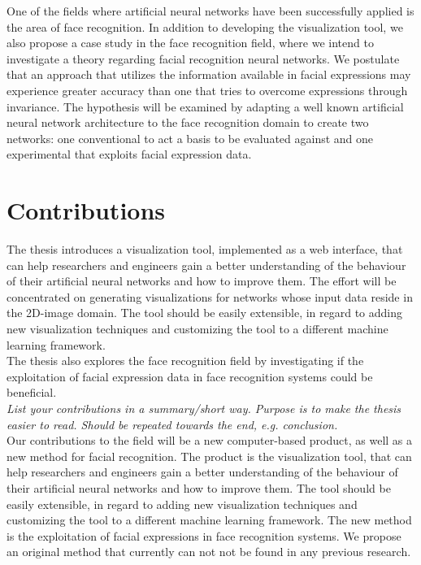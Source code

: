 \noindent One of the fields where artificial neural networks have been successfully applied is the area of face recognition. In addition to developing the visualization tool, we also propose a case study in the face recognition field, where we intend to investigate a theory regarding facial recognition neural networks. We postulate that an approach that utilizes the information available in facial expressions may experience greater accuracy than one that tries to overcome expressions through invariance. The hypothesis will be examined by adapting a well known artificial neural network architecture to the face recognition domain to create two networks: one conventional to act a basis to be evaluated against and one experimental that exploits facial expression data. \\

\section{Contributions}

The thesis introduces a visualization tool, implemented as a web interface, that can help researchers and engineers gain a better understanding of the behaviour of their artificial neural networks and how to improve them. The effort will be concentrated on generating visualizations for networks whose input data reside in the 2D-image domain. The tool should be easily extensible, in regard to adding new visualization techniques and customizing the tool to a different machine learning framework. \\

\noindent The thesis also explores the face recognition field by investigating if the exploitation of facial expression data in face recognition systems could be beneficial. \\

\noindent\textit{List your contributions in a summary/short way. Purpose is to make the thesis easier to read. Should be repeated towards the end, e.g. conclusion.} \\

\noindent Our contributions to the field will be a new computer-based product, as well as a new method for facial recognition. The product is the visualization tool, that can help researchers and engineers gain a better understanding of the behaviour of their artificial neural networks and how to improve them. The tool should be easily extensible, in regard to adding new visualization techniques and customizing the tool to a different machine learning framework. The new method is the exploitation of facial expressions in face recognition systems. We propose an original method that currently can not not be found in any previous research.

